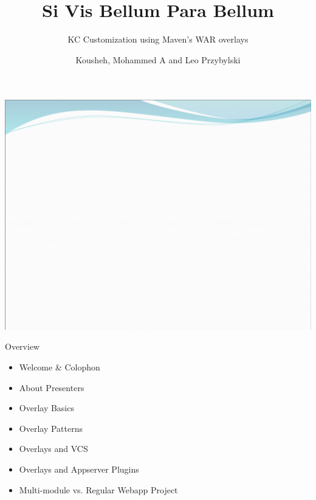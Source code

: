 \documentclass[xcolor=dvipsnames,14pt,professionalfonts]{beamer}
\begin{document}
\title{Si Vis Bellum Para Bellum}
\subtitle{KC Customization using Maven's WAR overlays}
\author[Leo]{Kousheh, Mohammed A and Leo Przybylski}

\usebackgroundtemplate%
{%
    \includegraphics[width=\paperwidth,height=\paperheight]{images/header.png}%
}

{
%
\begin{frame}[plain]
  \titlepage
\end{frame}
}

\begin{frame}{Overview}
  \begin{itemize}
  \item Welcome \& Colophon
  \item About Presenters
  \item Overlay Basics
  \item Overlay Patterns
  \item Overlays and VCS
  \item Overlays and Appserver Plugins
  \item Multi-module vs. Regular Webapp Project
  \end{itemize}
\end{frame}
\end{document}
